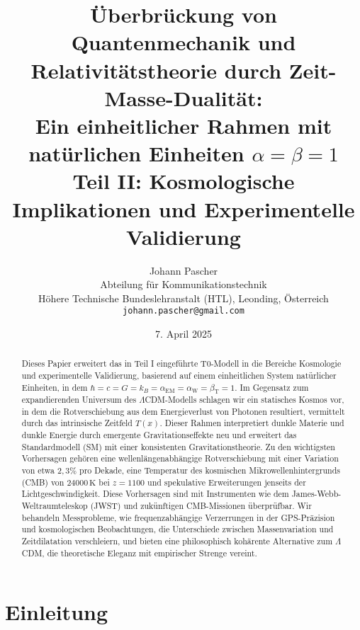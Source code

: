 \documentclass[12pt,a4paper]{article}
\title{Überbrückung von Quantenmechanik und Relativitätstheorie durch Zeit-Masse-Dualität: \\ Ein einheitlicher Rahmen mit natürlichen Einheiten \(\alpha = \beta = 1\) \\ Teil II: Kosmologische Implikationen und Experimentelle Validierung}
\author{Johann Pascher\\
	Abteilung für Kommunikationstechnik\\
	Höhere Technische Bundeslehranstalt (HTL), Leonding, Österreich\\
	\texttt{johann.pascher@gmail.com}}
\date{7. April 2025}
\newcommand{\Tfield}{T(x)}
\newcommand{\alphaEM}{\alpha_{\text{EM}}}
\newcommand{\alphaW}{\alpha_{\text{W}}}
\newcommand{\betaT}{\beta_{\text{T}}}
\begin{document}
	
	\maketitle
	
	\begin{abstract}
		Dieses Papier erweitert das in Teil I eingeführte T0-Modell in die Bereiche Kosmologie und experimentelle Validierung, basierend auf einem einheitlichen System natürlicher Einheiten, in dem \(\hbar = c = G = k_B = \alphaEM = \alphaW = \betaT = 1\). Im Gegensatz zum expandierenden Universum des \(\Lambda\)CDM-Modells schlagen wir ein statisches Kosmos vor, in dem die Rotverschiebung aus dem Energieverlust von Photonen resultiert, vermittelt durch das intrinsische Zeitfeld \(\Tfield\). Dieser Rahmen interpretiert dunkle Materie und dunkle Energie durch emergente Gravitationseffekte neu und erweitert das Standardmodell (SM) mit einer konsistenten Gravitationstheorie. Zu den wichtigsten Vorhersagen gehören eine wellenlängenabhängige Rotverschiebung mit einer Variation von etwa \(2,3\%\) pro Dekade, eine Temperatur des kosmischen Mikrowellenhintergrunds (CMB) von \(24000 \, \text{K}\) bei \(z = 1100\) und spekulative Erweiterungen jenseits der Lichtgeschwindigkeit. Diese Vorhersagen sind mit Instrumenten wie dem James-Webb-Weltraumteleskop (JWST) und zukünftigen CMB-Missionen überprüfbar. Wir behandeln Messprobleme, wie frequenzabhängige Verzerrungen in der GPS-Präzision und kosmologischen Beobachtungen, die Unterschiede zwischen Massenvariation und Zeitdilatation verschleiern, und bieten eine philosophisch kohärente Alternative zum \(\Lambda\)CDM, die theoretische Eleganz mit empirischer Strenge vereint.
	\end{abstract}
	
	\section{Einleitung}
	\label{sec:introduction}
	
\end{document}
